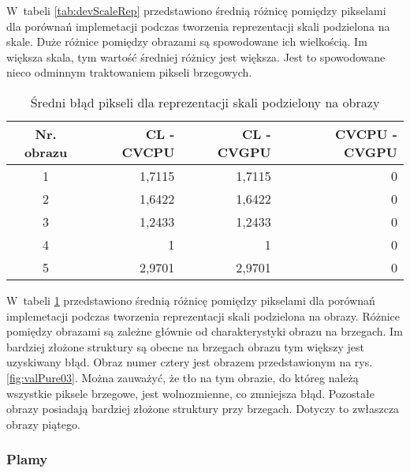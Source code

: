 W~tabeli \ref{tab:devScaleRep} przedstawiono średnią różnicę pomiędzy pikselami dla porównań implemetacji podczas tworzenia reprezentacji skali podzielona na skale. Duże różnice pomiędzy obrazami są spowodowane ich wielkością. Im większa skala, tym wartość średniej różnicy jest większa. Jest to spowodowane nieco odminnym traktowaniem pikseli brzegowych. 

\begin{center}
\begin{table}
\centering
\caption{Średni błąd pikseli dla reprezentacji skali podzielony na obrazy}
\label{tab:devImageRep}
\begin{tabular}{|c|r|r|r|}
\hline
Nr. obrazu & CL - CVCPU & CL - CVGPU & CVCPU - CVGPU \\ \hline
1 & 1,7115 & 1,7115 & 0 \\ \hline
2 & 1,6422 & 1,6422 & 0 \\ \hline
3 & 1,2433 & 1,2433 & 0 \\ \hline
4 & 1 & 1 & 0 \\ \hline
5 & 2,9701 & 2,9701 & 0 \\ \hline
\end{tabular}
\end{table}
\end{center}

W~tabeli \ref{tab:devImageRep} przedstawiono średnią różnicę pomiędzy pikselami dla porównań implemetacji podczas tworzenia reprezentacji skali podzielona na obrazy. Różnice pomiędzy obrazami są zależne głównie od charakterystyki obrazu na brzegach. Im bardziej złożone struktury są obecne na brzegach obrazu tym większy jest uzyskiwany błąd. Obraz numer cztery jest obrazem przedstawionym na rys. \ref{fig:valPure03}. Można zauważyć, że tło na tym obrazie, do któreg należą wszystkie piksele brzegowe, jest wolnozmienne, co zmniejsza błąd. Pozostałe obrazy posiadają bardziej złożone struktury przy brzegach. Dotyczy to zwłaszcza obrazy piątego.

\subsubsection{Plamy}
\label{subsubsec:plamyTabele}

